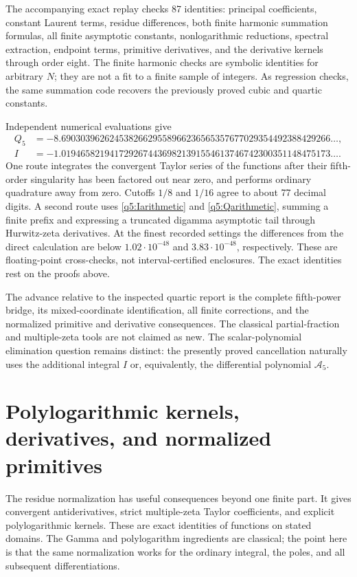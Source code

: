 \documentclass[11pt,a4paper]{article}
\numberwithin{equation}{section}
\theoremstyle{definition}
\begin{document}
The accompanying exact replay checks 87 identities: principal
coefficients, constant Laurent terms, residue differences, both finite
harmonic summation formulas, all finite asymptotic constants,
nonlogarithmic reductions, spectral extraction, endpoint terms,
primitive derivatives, and the derivative kernels through order eight.
The finite harmonic checks are symbolic identities for arbitrary $N$;
they are not a fit to a finite sample of integers.  As regression checks,
the same summation code recovers the previously proved cubic and
quartic constants.

Independent numerical evaluations give
\begin{align*}
 Q_5&=-8.69030396262453826629558966236565357677029354492388429266\ldots,\\
 I&=-1.01946582194172926744369821391554613746742300351148475173\ldots.
\end{align*}
One route integrates the convergent Taylor series of the functions
after their fifth-order singularity has been factored out near zero,
and performs ordinary quadrature away from zero.  Cutoffs $1/8$ and
$1/16$ agree to about 77 decimal digits.  A second route uses
\eqref{q5:Iarithmetic} and \eqref{q5:Qarithmetic}, summing a finite
prefix and expressing a truncated digamma asymptotic tail through
Hurwitz-zeta derivatives.  At the finest recorded settings the
differences from the direct calculation are below
$1.02\cdot10^{-48}$ and $3.83\cdot10^{-48}$, respectively.
These are floating-point cross-checks, not interval-certified
enclosures.  The exact identities rest on the proofs above.

The advance relative to the inspected quartic report is the complete
fifth-power bridge, its mixed-coordinate identification, all finite
corrections, and the normalized primitive and derivative consequences.
The classical partial-fraction and multiple-zeta tools are not claimed
as new.  The scalar-polynomial elimination question remains distinct:
the presently proved cancellation naturally uses the additional
integral $I$ or, equivalently, the differential polynomial
$\mathcal A_5$.


\section{Polylogarithmic kernels, derivatives, and normalized primitives}
\label{sec:calculus}

The residue normalization has useful consequences beyond one finite
part. It gives convergent antiderivatives, strict multiple-zeta Taylor
coefficients, and explicit polylogarithmic kernels. These are exact
identities of functions on stated domains. The Gamma and polylogarithm
ingredients are classical; the point here is that the same normalization
works for the ordinary integral, the poles, and all subsequent
differentiations.
\end{document}
